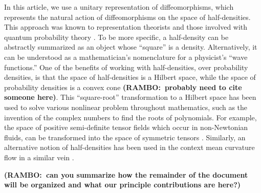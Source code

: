 \documentclass[final,leqno]{siamltex1213}
\newcommand{\ram}[1]{{\normalsize{\textbf{({\color{red}RAMBO:\ }#1)}}}}
\begin{document}
In this article, we use a unitary representation of diffeomorphisms, which represents the natural action of diffeomorphisms on the space of half-densities.
This approach was known to representation theorists \cite{VershilGelfandGraev1975,Ismagilov1975} and those involved with quantum probability theory \cite{Meyer1998,Parthasarathy2012}.
To be more specific, a half-density can be abstractly summarized as an object whose ``square'' is a density.
Alternatively, it can be understood as a mathematician's nomenclature for a physicist's ``wave functions.''
One of the benefits of working with half-densities, over probability densities, is that the space of half-densities is a Hilbert space, while the space of probability densities is a convex cone \ram{probably need to cite someone here}.
This ``square-root'' transformation to a Hilbert space has been used to solve various nonlinear problem throughout mathematics, such as the invention of the complex numbers to find the roots of polynomials.
For example, the space of positive semi-definite tensor fields which occur in non-Newtonian fluids, can be transformed into the space of symmetric tensors \cite{Balci2011}.
Similarly, an alternative notion of half-densities has been used in the context mean curvature flow in a similar vein \cite{Crane2013}.

\ram{can you summarize how the remainder of the document will be organized and what our principle contributions are here?}
\end{document}
